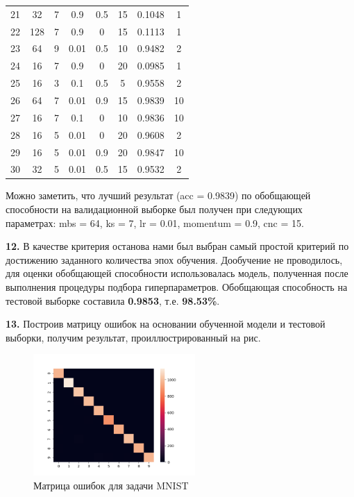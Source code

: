 \begin{table}[ht]
\begin{tabular}{c c c c c c c c}
		21       & 32  & 7  & 0.9   & 0.5      & 15  & 0.1048 & 1  \\
		22       & 128 & 7  & 0.9   & 0        & 15  & 0.1113 & 1  \\
		23       & 64  & 9  & 0.01  & 0.5      & 10  & 0.9482 & 2  \\
		24       & 16  & 7  & 0.9   & 0        & 20  & 0.0985 & 1  \\
		25       & 16  & 3  & 0.1   & 0.5      & 5   & 0.9558 & 2  \\
		26       & 64  & 7  & 0.01  & 0.9      & 15  & 0.9839 & 10 \\
		27       & 16  & 7  & 0.1   & 0        & 10  & 0.9836 & 10 \\
		28       & 16  & 5  & 0.01  & 0        & 20  & 0.9608 & 2  \\
		29       & 16  & 5  & 0.01  & 0.9      & 20  & 0.9847 & 10 \\
		30       & 32  & 5  & 0.01  & 0.5      & 15  & 0.9532 & 2  \\
		\hline
	\end{tabular}
	\label{table:nonlin}
\end{table}

Можно заметить, что лучший результат (acc = 0.9839) по обобщающей способности на валидационной выборке был получен при следующих параметрах: mbs = 64, ks = 7, lr = 0.01, momentum = 0.9, cnc = 15.


\textbf{12.} В качестве критерия останова нами был выбран самый простой критерий по достижению заданного количества эпох обучения. Дообучение не проводилось, для оценки обобщающей способности использовалась модель, полученная после выполнения процедуры подбора гиперпараметров. Обобщающая способность на тестовой выборке составила \textbf{0.9853}, т.е. \textbf{98.53\%}.


\textbf{13.} Построив матрицу ошибок на основании обученной модели и тестовой выборки, получим результат, проиллюстрированный на рис. 

\begin{figure}[h]
	\centering
	\includegraphics[width=0.55\textwidth]{author/part3/figures/conf_matrix_result.png}
	\caption{Матрица ошибок для задачи MNIST}
	\label{fig:conf_matrix_result}
\end{figure}

